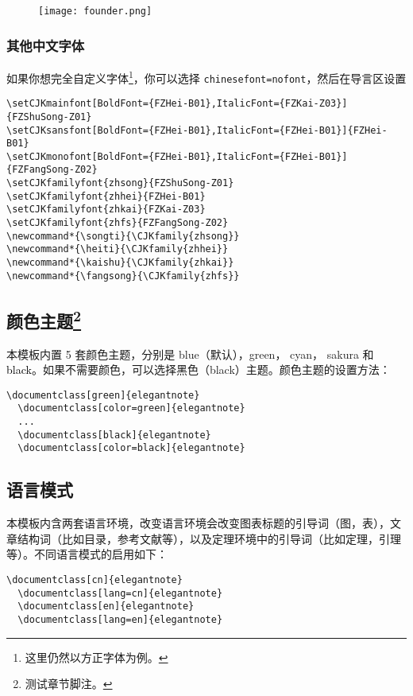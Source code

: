 \documentclass[cn,hazy,blue,14pt,screen]{elegantnote}
\begin{document}
\begin{figure}[!htb]
    \centering
    \texttt{[image: founder.png]}
\end{figure}

\subsubsection{其他中文字体}
如果你想完全自定义字体\footnote{这里仍然以方正字体为例。}，你可以选择 \lstinline{chinesefont=nofont}，然后在导言区设置
\begin{lstlisting}
\setCJKmainfont[BoldFont={FZHei-B01},ItalicFont={FZKai-Z03}]{FZShuSong-Z01}
\setCJKsansfont[BoldFont={FZHei-B01},ItalicFont={FZHei-B01}]{FZHei-B01}
\setCJKmonofont[BoldFont={FZHei-B01},ItalicFont={FZHei-B01}]{FZFangSong-Z02}
\setCJKfamilyfont{zhsong}{FZShuSong-Z01}
\setCJKfamilyfont{zhhei}{FZHei-B01}
\setCJKfamilyfont{zhkai}{FZKai-Z03}
\setCJKfamilyfont{zhfs}{FZFangSong-Z02}
\newcommand*{\songti}{\CJKfamily{zhsong}}
\newcommand*{\heiti}{\CJKfamily{zhhei}}
\newcommand*{\kaishu}{\CJKfamily{zhkai}}
\newcommand*{\fangsong}{\CJKfamily{zhfs}}
\end{lstlisting}


\subsection[颜色主题]{颜色主题\footnote{测试章节脚注。}}

本模板内置 5 套颜色主题，分别是 \textcolor{eblue}{blue}（默认），\textcolor{egreen}{green}， \textcolor{ecyan}{cyan}， \textcolor{sakura}{sakura} 和 \textcolor{black}{black}。如果不需要颜色，可以选择黑色（black）主题。颜色主题的设置方法：
\begin{lstlisting}[frame=none]  
  \documentclass[green]{elegantnote}
  \documentclass[color=green]{elegantnote}
  ...
  \documentclass[black]{elegantnote}
  \documentclass[color=black]{elegantnote}
\end{lstlisting}


\subsection{语言模式}

本模板内含两套语言环境，改变语言环境会改变图表标题的引导词（图，表），文章结构词（比如目录，参考文献等），以及定理环境中的引导词（比如定理，引理等）。不同语言模式的启用如下：
\begin{lstlisting}[frame=none]  
  \documentclass[cn]{elegantnote} 
  \documentclass[lang=cn]{elegantnote} 
  \documentclass[en]{elegantnote} 
  \documentclass[lang=en]{elegantnote}
\end{lstlisting}
\end{document}
